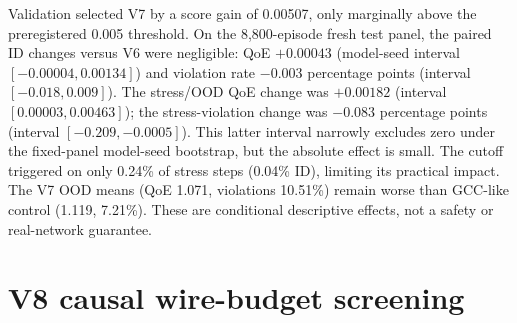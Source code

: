 \documentclass[10pt]{article}
\providecommand{\uncertaintyshieldpath}{generated-uncertainty-shield-v7}
\begin{document}
Validation selected V7 by a score gain of 0.00507, only marginally above the preregistered 0.005 threshold. On the 8,800-episode fresh test panel, the paired ID changes versus V6 were negligible: QoE $+0.00043$ (model-seed interval $[-0.00004,0.00134]$) and violation rate $-0.003$ percentage points (interval $[-0.018,0.009]$). The stress/OOD QoE change was $+0.00182$ (interval $[0.00003,0.00463]$); the stress-violation change was $-0.083$ percentage points (interval $[-0.209,-0.0005]$). This latter interval narrowly excludes zero under the fixed-panel model-seed bootstrap, but the absolute effect is small. The cutoff triggered on only 0.24\% of stress steps (0.04\% ID), limiting its practical impact. The V7 OOD means (QoE 1.071, violations 10.51\%) remain worse than GCC-like control (1.119, 7.21\%). These are conditional descriptive effects, not a safety or real-network guarantee.

\begin{table}[t]
\centering\resizebox{\textwidth}{!}{}
\caption{V7 validation metrics and locked promotion decision relative to the V6 screen.}
\label{tab:v7-selection}
\end{table}

\begin{table}[t]
\centering\resizebox{\textwidth}{!}{}
\caption{V7-minus-V6 paired fresh-test effects on the fixed trace panel. Violation contrasts are percentage points; intervals resample model seeds.}
\label{tab:v7-contrasts}
\end{table}

\begin{table}[t]
\centering\resizebox{\textwidth}{!}{}
\caption{V7 validation stress-family violation differences relative to V6 and the frozen per-family promotion limit.}
\label{tab:v7-families}
\end{table}

\begin{table}[t]
\centering\resizebox{\textwidth}{!}{}
\caption{V7 disagreement-screen step diagnostics summarized by model seed; time steps are not independent experimental units.}
\label{tab:v7-diagnostics}
\end{table}

\clearpage
\section{V8 causal wire-budget screening}
\end{document}
